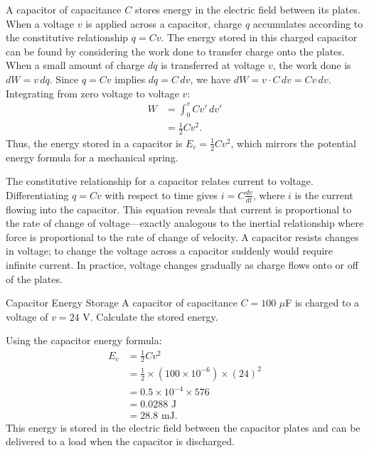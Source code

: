 A capacitor of capacitance $C$ stores energy in the electric field between its plates. When a voltage $v$ is applied across a capacitor, charge $q$ accumulates according to the constitutive relationship $q = Cv$. The energy stored in this charged capacitor can be found by considering the work done to transfer charge onto the plates. When a small amount of charge $dq$ is transferred at voltage $v$, the work done is $dW = v\,dq$. Since $q = Cv$ implies $dq = C\,dv$, we have $dW = v \cdot C\,dv = Cv\,dv$. Integrating from zero voltage to voltage $v$:
\begin{align}
W &= \int_0^v Cv' \, dv' \\
  &= \frac{1}{2}Cv^2 .
\end{align}
Thus, the energy stored in a capacitor is $E_c = \frac{1}{2}Cv^2$, which mirrors the potential energy formula for a mechanical spring.

The constitutive relationship for a capacitor relates current to voltage. Differentiating $q = Cv$ with respect to time gives $i = C\frac{dv}{dt}$, where $i$ is the current flowing into the capacitor. This equation reveals that current is proportional to the rate of change of voltage—exactly analogous to the inertial relationship where force is proportional to the rate of change of velocity. A capacitor resists changes in voltage; to change the voltage across a capacitor suddenly would require infinite current. In practice, voltage changes gradually as charge flows onto or off of the plates.

\begin{example}{Capacitor Energy Storage}
A capacitor of capacitance $C = 100$ $\mu$F is charged to a voltage of $v = 24$ V. Calculate the stored energy.

Using the capacitor energy formula:
\begin{align}
E_c &= \frac{1}{2}Cv^2 \\
    &= \frac{1}{2} \times (100 \times 10^{-6}) \times (24)^2 \\
    &= 0.5 \times 10^{-4} \times 576 \\
    &= 0.0288 \text{ J} \\
    &= 28.8 \text{ mJ}.
\end{align}
This energy is stored in the electric field between the capacitor plates and can be delivered to a load when the capacitor is discharged.
\end{example}

